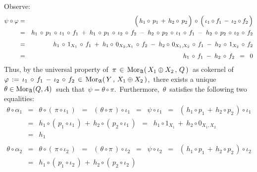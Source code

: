 \begin{enumerate}
	Observe:
	\begin{eqnarray*}
	\psi \circ \varphi
	& = &
		\left(\,h_{1} \circ\, p_{1} \,\overset{{\color{white}.}}{+}\, h_{2} \circ\, p_{2}\,\right)
		\,\circ\,
		\left(\,\iota_{1} \circ f_{1} \,\overset{{\color{white}.}}{-}\, \iota_{2} \circ f_{2}\,\right)
	\\
	& = &
		h_{1} \,\circ\, p_{1} \,\circ\, \iota_{1} \,\circ\, f_{1}
		\; + \;
		h_{1} \,\circ\, p_{1} \,\circ\, \iota_{2} \,\circ\, f_{2}
		\; - \;
		h_{2} \,\circ\, p_{2} \,\circ\, \iota_{1} \,\circ\, f_{1}
		\; - \;
		h_{2} \,\circ\, p_{2} \,\circ\, \iota_{2} \,\circ\, f_{2}
	\\
	& \overset{{\color{white}1}}{=} &
		h_{1} \,\circ\, 1_{X_{1}} \,\circ\, f_{1}
		\; + \;
		h_{1} \circ\, 0_{X_{2},X_{1}} \,\circ\, f_{2}
		\; - \;
		h_{2} \circ\, 0_{X_{1},X_{2}} \,\circ\, f_{1}
		\; - \;
		h_{2} \,\circ\, 1_{X_{2}} \,\circ\, f_{2}
	\\
	& \overset{{\color{white}1}}{=} &
		h_{1} \,\circ\, f_{1}
		\; - \;
		h_{2} \,\circ\, f_{2}
	\;\; = \;\;
		0
	\end{eqnarray*}
	Thus, by the universal property of
	\,$\pi \,\in\, \textnormal{Mor}_{\mathfrak{A}}(\,X_{1} \oplus X_{2}\,,\,Q\,)$\,
	as cokernel of
	\,$\varphi\,:=\,\iota_{1}\,\circ\,f_{1}\,-\,\iota_{2}\,\circ\,f_{2}\,\in\,\textnormal{Mor}_{\mathfrak{A}}(\,Y\,,\,X_{1} \oplus X_{2}\,)$,\,
	there exists a unique
	\,$\theta \in \textnormal{Mor}_{\mathfrak{A}}(Q,A)$\,
	such that
	\,$\psi = \theta \circ \pi$.\,
	Furthermore, \,$\theta$\, satisfies the following two equalities:
	\begin{eqnarray*}
	\theta \circ \alpha_{1}
	& = &
		\theta \circ (\,\pi \circ \iota_{1}\,)
	\;\; = \;\;
		(\,\theta \circ \pi\,) \circ \iota_{1}
	\;\; = \;\;
		\psi \circ \iota_{1} 
	\;\; = \;\;
		(\,h_{1} \circ p_{1} \,+\, h_{2} \circ p_{2} \,) \circ \iota_{1}
	\\
	& = &
		h_{1} \circ (\,p_{1} \circ \iota_{1}\,)
		\,+\
		h_{2} \circ (\,p_{2} \circ \iota_{1}\,)
	\;\; = \;\;
		h_{1} \circ 1_{X_{1}}
		\,+\
		h_{2} \circ 0_{X_{1},X_{2}}
	\\
	& = &
		h_{1}
	\\ \\
	\theta \circ \alpha_{2}
	& = &
		\theta \circ (\,\pi \circ \iota_{2}\,)
	\;\; = \;\;
		(\,\theta \circ \pi\,) \circ \iota_{2}
	\;\; = \;\;
		\psi \circ \iota_{2}
	\;\; = \;\;
		(\,h_{1} \circ p_{1} \,+\, h_{2} \circ p_{2} \,) \circ \iota_{2}
	\\
	& = &
		h_{1} \circ (\,p_{1} \circ \iota_{2}\,)
		\,+\
		h_{2} \circ (\,p_{2} \circ \iota_{2}\,)

\end{eqnarray*}
\end{enumerate}
